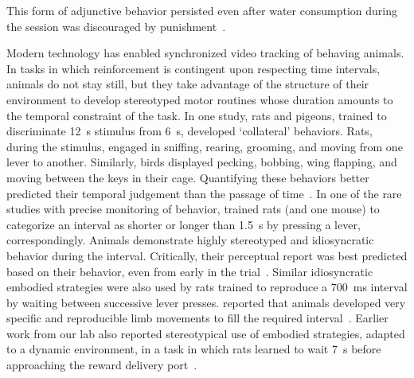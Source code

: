 This form of adjunctive behavior persisted even after water consumption during the session was discouraged by punishment~\cite{Falk1971}.\footnotemark
{}
\par
Modern technology has enabled synchronized video tracking of behaving animals.
In tasks in which reinforcement is contingent upon respecting time intervals, animals do not stay still, but they take advantage of the structure of their environment to develop stereotyped motor routines whose duration amounts to the temporal constraint of the task.
In one study, rats and pigeons, trained to discriminate 12~s stimulus from 6~s, developed `collateral' behaviors.
Rats, during the stimulus, engaged in sniffing, rearing, grooming, and moving from one lever to another.
Similarly, birds displayed pecking, bobbing\footnotemark, wing flapping, and moving between the keys in their cage.
Quantifying these behaviors better predicted their temporal judgement than the passage of time~\cite{Fetterman1998BehProc}.
In one of the rare studies with precise monitoring of behavior, \citeauthor{Gouvea2014} trained rats (and one mouse) to categorize an interval as shorter or longer than 1.5~s by pressing a lever, correspondingly.
Animals demonstrate highly stereotyped and idiosyncratic behavior during the interval.
Critically, their perceptual report was best predicted based on their behavior, even from early in the trial~\cite{Gouvea2014}.
Similar idiosyncratic embodied strategies were also used by rats trained to reproduce a 700~ms interval by waiting between successive lever presses.
 reported that animals developed very specific and reproducible limb movements to fill the required interval~\cite{Kawai2015}.
Earlier work from our lab also reported stereotypical use of embodied strategies, adapted to a dynamic environment, in a task in which rats learned to wait 7~s before approaching the reward delivery port~\cite{Rueda2015NN}.
